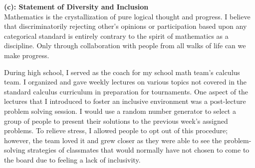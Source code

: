 \documentclass[11pt]{article}
\begin{document}
\noindent\textbf{(c): Statement of Diversity and Inclusion}\\


Mathematics is the crystallization of pure logical thought and progress. I believe that discriminatorily rejecting other’s opinions or participation based upon any categorical standard is entirely contrary to the spirit of mathematics as a discipline. Only through collaboration with people from all walks of life can we make progress.

During high school, I served as the coach for my school math team’s calculus team. I organized and gave weekly lectures on various topics not covered in the standard calculus curriculum in preparation for tournaments. One aspect of the lectures that I introduced to foster an inclusive environment was a post-lecture problem solving session. I would use a random number generator to select a group of people to present their solutions to the previous week’s assigned problems. To relieve stress, I allowed people to opt out of this procedure; however, the team loved it and grew closer as they were able to see the problem-solving strategies of classmates that would normally have not chosen to come to the board due to feeling a lack of inclusivity.
\end{document}
